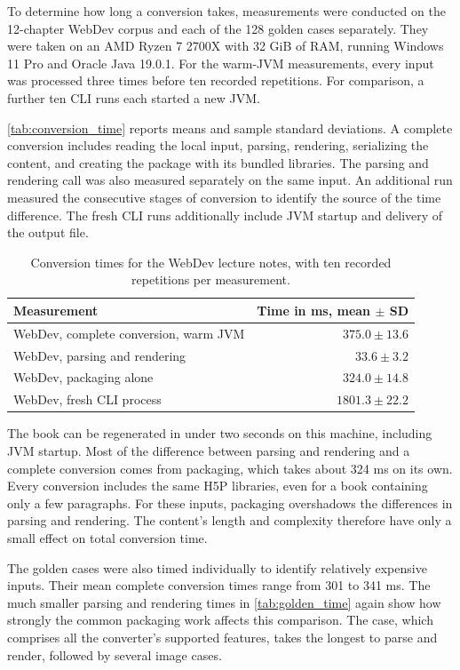 To determine how long a conversion takes, measurements were conducted on the 12-chapter WebDev corpus and each of the 128 golden cases separately.
They were taken on an AMD Ryzen 7 2700X with 32 GiB of RAM, running Windows 11 Pro and
Oracle Java 19.0.1.
For the warm-JVM measurements, every input was processed three times before ten recorded repetitions.
For comparison, a further ten CLI runs each started a new JVM\@.

\autoref{tab:conversion_time} reports means and sample standard deviations.
A complete conversion includes reading the local input, parsing, rendering, serializing the content,
and creating the package with its bundled libraries.
The parsing and rendering call was also measured separately on the same input.
An additional run measured the consecutive stages of conversion to identify the source of the
time difference.
The fresh CLI runs additionally include JVM startup and delivery of the output file.

\begin{table}[htbp]
\centering
\begin{tabular}{@{}lr@{}}
\toprule
Measurement & Time in ms, mean $\pm$ SD \\
\midrule
WebDev, complete conversion, warm JVM & $375.0 \pm 13.6$ \\
WebDev, parsing and rendering & $33.6 \pm 3.2$ \\
WebDev, packaging alone & $324.0 \pm 14.8$ \\
WebDev, fresh CLI process & $1801.3 \pm 22.2$ \\
\bottomrule
\end{tabular}
\caption[Conversion times for the WebDev lecture notes]{Conversion times for the WebDev lecture notes, with ten recorded repetitions per measurement.}
\label{tab:conversion_time}
\end{table}

The book can be regenerated in under two seconds on this machine, including JVM startup.
Most of the difference between parsing and rendering and a complete conversion comes from
packaging, which takes about 324 ms on its own.
Every conversion includes the same H5P libraries, even for a book containing only a few paragraphs.
For these inputs, packaging overshadows the differences in parsing and rendering.
The content's length and complexity therefore have only a small effect on total conversion time.

The golden cases were also timed individually to identify relatively expensive inputs.
Their mean complete conversion times range from 301 to 341 ms.
The much smaller parsing and rendering times in \autoref{tab:golden_time} again show how strongly the
common packaging work affects this comparison.
The  case, which comprises all the converter's supported features, takes the longest to parse and render, followed by several
image cases.

